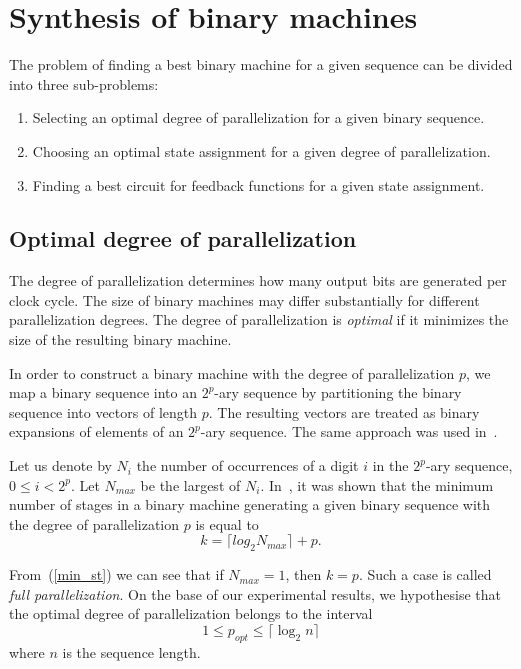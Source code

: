 \documentclass[10pt,conference]{IEEEtran}
\begin{document}
\section{Synthesis of binary machines} \label{sa1}

The problem of finding a best binary machine for a given sequence can be divided into
three sub-problems:
\begin{enumerate}
\item Selecting an optimal degree of parallelization for a given binary sequence.
\item Choosing an optimal state assignment for a given degree of parallelization.
\item Finding a best circuit for feedback functions for a given state assignment. 
\end{enumerate}

\subsection{Optimal degree of parallelization}

The degree of parallelization determines how many output bits are
generated per clock cycle. 
The size of binary machines may differ substantially for different 
parallelization degrees.
The degree of parallelization is {\em optimal} if it minimizes the size 
of the resulting binary machine. 

In order to construct a binary machine with the degree of parallelization 
$p$, we map a binary sequence into an $2^p$-ary sequence by
partitioning the binary sequence into vectors of length $p$.
The resulting vectors are treated as binary expansions of elements 
of an $2^p$-ary sequence. The same approach was used in~\cite{Du11a}. 

Let us denote by $N_i$ the number of occurrences of a digit $i$ in the $2^p$-ary sequence,
$0 \leq i < 2^p$. Let $N_{max}$ be the largest of $N_i$. In~\cite{Du11a}, it was shown that the minimum number of stages in a binary machine generating a given binary sequence with the degree 
of parallelization $p$ is equal to 
\begin{equation} \label{min_st}
k = \lceil log_2 N_{max} \rceil + p.
\end{equation}


From~(\ref{min_st}) we can see that if $N_{max} = 1$,
then $k = p$. Such a case is called {\em full parallelization}. 
On the base of our experimental results, we hypothesise that
the optimal degree of parallelization belongs to the interval
\begin{equation} \label{opt_st}
 1 \leq p_{opt} \leq \lceil \log_2 n \rceil
\end{equation}
where $n$ is the sequence length.
\end{document}
